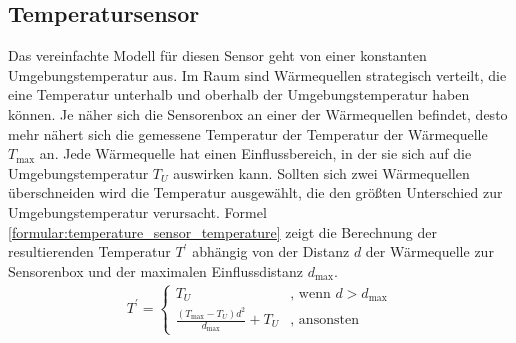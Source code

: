 \subsection{Temperatursensor}
Das vereinfachte Modell für diesen Sensor geht von einer konstanten Umgebungstemperatur aus.
Im Raum sind Wärmequellen strategisch verteilt, die eine Temperatur unterhalb und oberhalb der Umgebungstemperatur haben können.
Je näher sich die Sensorenbox an einer der Wärmequellen befindet, desto mehr nähert sich die gemessene Temperatur der Temperatur der Wärmequelle $T_{\max}$ an.
\newline
\newline
Jede Wärmequelle hat einen Einflussbereich, in der sie sich auf die Umgebungstemperatur $T_U$ auswirken kann.
Sollten sich zwei Wärmequellen überschneiden wird die Temperatur ausgewählt, die den größten Unterschied zur Umgebungstemperatur verursacht.
Formel \ref{formular:temperature_sensor_temperature} zeigt die Berechnung der resultierenden Temperatur $T^{\prime}$ abhängig von der Distanz $d$ der
Wärmequelle zur Sensorenbox und der maximalen Einflussdistanz $d_{\max}$.
\begin{align}
    \label{formular:temperature_sensor_temperature}
    T^{\prime} = \begin{cases}
                     T_U & \text{, wenn } d > d_{\max} \\
                     \frac{(T_{\max} - T_U)d^2}{d_{\max}} + T_U & \text{, ansonsten}
    \end{cases}
\end{align}

